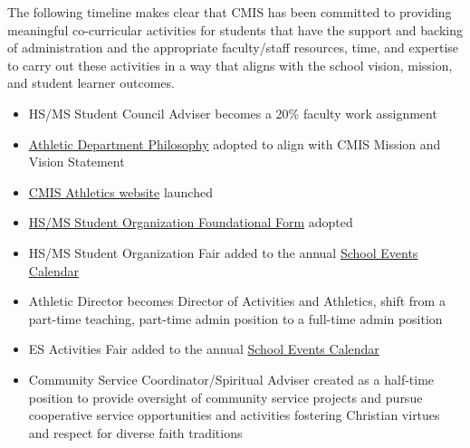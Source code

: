 \begin{findings}

The following timeline makes clear that CMIS has been committed to providing meaningful co-curricular activities for students that have the support and backing of administration and the appropriate faculty/staff resources, time, and expertise to carry out these activities in a way that aligns with the school vision, mission, and student learner outcomes.

\begin{itemize}
\item HS/MS Student Council Adviser becomes a 20\% faculty work assignment
\item \href{https://docs.google.com/document/d/1sTrMTOsEmYo4TcWgqYYYepmbt43RhWDNO9Juxo3xS20/edit?usp=sharing}{Athletic Department Philosophy} adopted to align with CMIS Mission and Vision Statement
\item \href{http://blogs.cmis.ac.th/eagles/athletics/}{CMIS Athletics website} launched
\end{itemize}

\begin{itemize}
\item \href{http://blogs.cmis.ac.th/eagles/clubs-activities/policies-forms/}{HS/MS Student Organization Foundational Form} adopted
\item HS/MS Student Organization Fair added to the annual \href{http://blogs.cmis.ac.th/eagles/calendars/events-calendar/}{School Events Calendar}
\end{itemize}

\begin{itemize}
\item Athletic Director becomes Director of Activities and Athletics, shift from a part-time teaching, part-time admin position to a full-time admin position
\item ES Activities Fair added to the annual \href{http://blogs.cmis.ac.th/eagles/calendars/events-calendar/}{School Events Calendar}
\item Community Service Coordinator/Spiritual Adviser created as a half-time position to provide oversight of community service projects and pursue cooperative service opportunities and activities fostering Christian virtues and respect for diverse faith traditions      
\end{itemize}


\end{findings}

